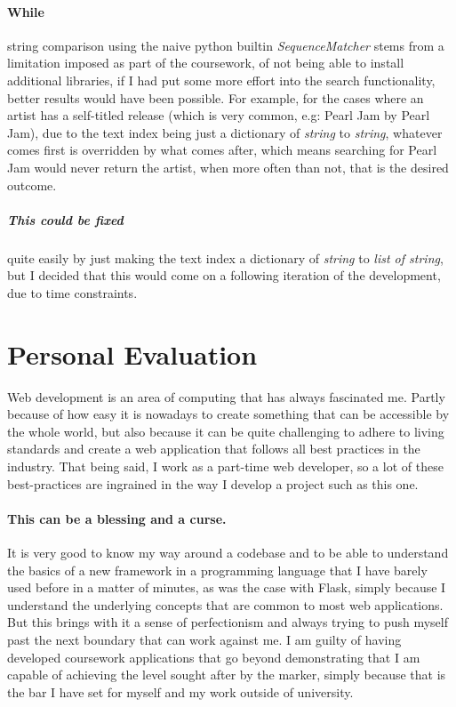 \documentclass[10pt, a4paper]{article}
\begin{document}
        \paragraph{While} string comparison using the naive python builtin \textit{SequenceMatcher}  stems from a limitation imposed as part of the coursework, of not being able to install additional libraries, if I had put some more effort into the search functionality, better results would have been possible. For example, for the cases where an artist has a self-titled release (which is very common, e.g: Pearl Jam by Pearl Jam), due to the text index being just a dictionary of \textit{string} to \textit{string}, whatever comes first is overridden by what comes after, which means searching for Pearl Jam would never return the artist, when more often than not, that is the desired outcome.
        \subparagraph{This could be fixed} quite easily by just making the text index a dictionary of \textit{string} to \textit{list of string}, but I decided that this would come on a following iteration of the development, due to time constraints.

        \section{Personal Evaluation}
        Web development is an area of computing that has always fascinated me. Partly because of how easy it is nowadays to create something that can be accessible by the whole world, but also because it can be quite challenging to adhere to living standards and create a web application that follows all best practices in the industry.
        That being said, I work as a part-time web developer, so a lot of these best-practices are ingrained in the way I develop a project such as this one.
        \paragraph{This can be a blessing and a curse.} It is very good to know my way around a codebase and to be able to understand the basics of a new framework in a programming language that I have barely used before in a matter of minutes, as was the case with Flask, simply because I understand the underlying concepts that are common to most web applications. But this brings with it a sense of perfectionism and always trying to push myself past the next boundary that can work against me. I am guilty of having developed coursework applications that go beyond demonstrating that I am capable of achieving the level sought after by the marker, simply because that is the bar I have set for myself and my work outside of university.
\end{document}
